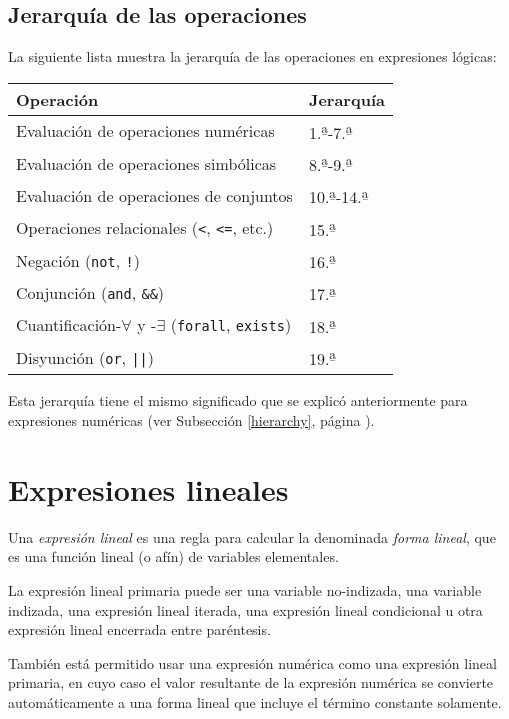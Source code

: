 \documentclass[11pt,spanish]{report}
\begin{document}
\subsection{Jerarquía de las operaciones}

La siguiente lista muestra la jerarquía de las operaciones en expresiones lógicas:

\noindent\hfil
\begin{tabular}{@{}ll@{}}
Operación&Jerarquía\\
\hline
Evaluación de operaciones numéricas&
1.{\textsuperscript{\b{a}}}-7.{\textsuperscript{\b{a}}}\\
Evaluación de operaciones simbólicas&
8.{\textsuperscript{\b{a}}}-9.{\textsuperscript{\b{a}}}\\
Evaluación de operaciones de conjuntos&
10.{\textsuperscript{\b{a}}}-14.{\textsuperscript{\b{a}}}\\
Operaciones relacionales ({\tt<}, {\tt<=}, etc.)&
15.{\textsuperscript{\b{a}}}\\
Negación ({\tt not}, {\tt!})&
16.{\textsuperscript{\b{a}}}\\
Conjunción ({\tt and}, {\tt\&\&})&
17.{\textsuperscript{\b{a}}}\\
Cuantificación-$\forall$ y -$\exists$ ({\tt forall}, {\tt exists})&
18.{\textsuperscript{\b{a}}}\\
Disyunción ({\tt or}, {\tt||})&
19.{\textsuperscript{\b{a}}}\\
\end{tabular}

Esta jerarquía tiene el mismo significado que se explicó anteriormente para expresiones numéricas (ver Subsección \ref{hierarchy}, página \pageref{hierarchy}).

\section{Expresiones lineales}

Una {\it expresión lineal} es una regla para calcular la denominada {\it forma lineal}, que es una función lineal (o afín) de variables elementales.

La expresión lineal primaria puede ser una variable no-indizada, una variable indizada, una expresión lineal iterada, una expresión lineal condicional u otra expresión lineal encerrada entre paréntesis.

También está permitido usar una expresión numérica como una expresión lineal primaria, en cuyo caso el valor resultante de la expresión numérica se convierte automáticamente a una forma lineal que incluye el término constante solamente.
\end{document}
